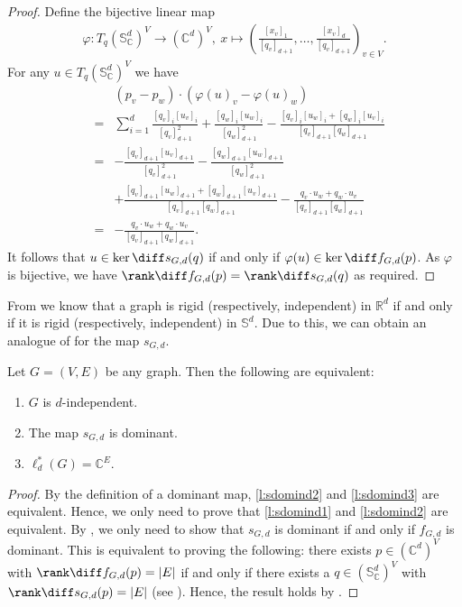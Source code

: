 \begin{proof}
	Define the bijective linear map
	\begin{align*}
		\varphi \colon T_q (\mathbb{S}_{\mathbb{C}}^{d})^{V} \rightarrow (\mathbb{C}^{d})^V, ~ x \mapsto \left( \frac{[x_v]_1}{[q_v]_{d+1}},\ldots, \frac{[x_v]_d}{[q_v]_{d+1}} \right)_{v \in V}.
	\end{align*}
	For any $u \in T_q (\mathbb{S}_{\mathbb{C}}^{d})^{V}$ we have
	\begin{eqnarray*}
		&~& (p_v-p_w)\cdot (\varphi(u)_v- \varphi(u)_w)\\
		&=& \sum_{i=1}^d \frac{[q_v]_i[u_v]_i}{[q_v]^2_{d+1}} +\frac{[q_w]_i[u_w]_i}{[q_w]^2_{d+1}} - \frac{[q_v]_i[u_w]_i + [q_w]_i[u_v]_i}{[q_v]_{d+1}[q_w]_{d+1}} \\
		&=& -\frac{[q_v]_{d+1}[u_v]_{d+1}}{[q_v]^2_{d+1}}-\frac{[q_w]_{d+1}[u_w]_{d+1}}{[q_w]^2_{d+1}} \\
		&&+ \frac{[q_v]_{d+1}[u_w]_{d+1} +[q_w]_{d+1}[u_v]_{d+1}}{[q_v]_{d+1}[q_w]_{d+1}} - \frac{q_v\cdot u_w + q_w \cdot u_v}{[q_v]_{d+1}[q_w]_{d+1}} \\
		&=& - \frac{q_v \cdot u_w + q_w \cdot u_v}{[q_v]_{d+1}[q_w]_{d+1}}.
	\end{eqnarray*}
		It follows that $u \in \ker \diff s_{G,d}(q)$ if and only if $\varphi(u) \in \ker \diff f_{G,d}(p)$.
		As $\varphi$ is bijective,
		we have $\rank \diff f_{G,d}(p)= \rank \diff s_{G,d}(q)$ as required.
\end{proof}

From  we know that a graph is rigid (respectively, independent) in $\mathbb{R}^d$ if and only if it is rigid (respectively, independent) in $\mathbb{S}^d$.
Due to this, we can obtain an analogue of  for the map $s_{G,d}$.

\begin{lemma}\label{l:domindsphere}
	Let $G=(V,E)$ be any graph.
	Then the following are equivalent:
	\begin{enumerate}
		\item \label{l:sdomind1} $G$ is $d$-independent.
		\item \label{l:sdomind2} The map $s_{G,d}$ is dominant.	
		\item \label{l:sdomind3} $\ell_d^*(G) = \mathbb{C}^E$.
	\end{enumerate}
\end{lemma} 

\begin{proof}
	By the definition of a dominant map, \ref{l:sdomind2} and \ref{l:sdomind3} are equivalent.
	Hence, we only need to prove that \ref{l:sdomind1} and \ref{l:sdomind2} are equivalent.
	By ,
	we only need to show that $s_{G,d}$ is dominant if and only if $f_{G,d}$ is dominant.
	This is equivalent to proving the following:
	there exists $p \in (\mathbb{C}^{d})^V$ with $\rank \diff f_{G,d}(p) = |E|$ if and only if
	there exists a $q \in (\mathbb{S}_{\mathbb{C}}^{d})^V$ with $\rank \diff s_{G,d}(p) = |E|$ (see ).
	Hence, the result holds by .
\end{proof}


